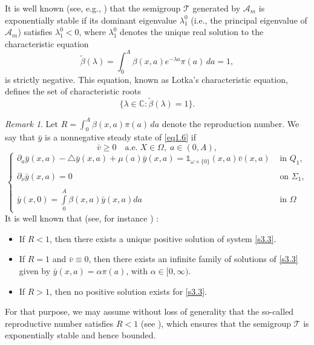 \documentclass[10pt, a4]{amsart}
\newcounter{assu}
\theoremstyle{plain}
\theoremstyle{definition}
\theoremstyle{remark}
\newtheorem{remark}[lemma]{Remark}
\numberwithin{equation}{section}
\begin{document}
 It is well known (see, e.g., \cite{ref24}) that the semigroup \(\mathcal{T}\) generated by \(\mathcal{A}_m\) is exponentially stable if its dominant eigenvalue \(\lambda_{1}^{0}\) (i.e., the principal eigenvalue of \(\mathcal{A}_m\)) satisfies \(\lambda_{1}^{0}<0\), where \(\lambda_{1}^{0}\) denotes the unique real solution to the characteristic equation
\[
\tilde{\beta}(\lambda)=\int_0^A \beta(x,a)e^{-\lambda a}\pi(a)\,da = 1,
\]
is strictly negative. This equation, known as Lotka's characteristic equation, defines the set of characteristic roots
\[
\{\lambda \in \mathbb{C} : \tilde{\beta}(\lambda)=1\}.
\]
\begin{remark}\label{re1.2}
Let \(R=\displaystyle\int_0^A \beta(x,a)\pi(a)\,da\) denote the reproduction number. We say that \(\bar{y}\) is a nonnegative steady state of \eqref{eq1.6} if 
 \[\bar{v}\ge0 \quad\text{a.e.}\; X\in\Omega,\; a\in(0,A),
 \]
\begin{equation}\label{s3.3}
\left\lbrace 
\begin{array}{ll}
\partial_{a}\bar{y}(x,a)-\triangle \bar{y}(x,a)+\mu(a) \bar{y}(x,a)=\mathds{1}_{\omega\times \lbrace0\rbrace}(x,a)\bar{v}(x,a) & \text{ in }  Q_1,\\
 \\\partial_{\nu}\bar{y}(x,a)=0 &\text{ on }  \Sigma_1,\\
 \\\bar{y}(x,0)=\displaystyle\int\limits_{0}^{A}\beta(x,a)\bar{y}(x,a)da &\text{ in }  \Omega
\end{array}
\right.
\end{equation}
It is well known that (see, for instance \cite[Theorem 3.1]{ref23}) :
\begin{itemize}
    \item[\(\bullet\)] If \(R<1\), then there exists a unique positive solution of system \eqref{s3.3}.
    \item[\(\bullet\)] If \(R=1\) and \(\bar{v}\equiv0\), then there exists an infinite family of solutions of \eqref{s3.3} given by \(\bar{y}(x,a)=\alpha\pi(a)\), with \(\alpha\in [0,\infty)\).
    \item[\(\bullet\)] If \(R>1\), then no positive solution exists for \eqref{s3.3}.
\end{itemize}
\end{remark}
For that purpose, we may assume without loss of generality that the so-called reproductive number satisfies \( R < 1 \) (see \cite[Remark 2.6 and Theorem 2.2]{ref24}),  which ensures that the semigroup \(\mathcal{T}\) is exponentially stable and hence bounded. 
\end{document}
